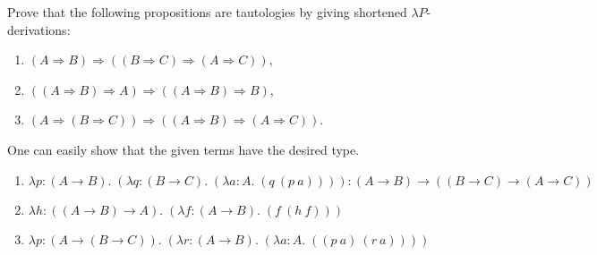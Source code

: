 \begin{problem}{5.7}
    Prove that the following propositions are tautologies by giving shortened $\lambda P$-derivations:
    \begin{enumerate}[label=$(\alph*)$]
    \item $(A \Rightarrow B) \Rightarrow ((B \Rightarrow C) \Rightarrow (A \Rightarrow C))$,
    \item $((A \Rightarrow B) \Rightarrow A) \Rightarrow ((A \Rightarrow B) \Rightarrow B)$,
    \item $(A \Rightarrow (B \Rightarrow C)) \Rightarrow ((A \Rightarrow B) \Rightarrow (A \Rightarrow C))$.
    \end{enumerate} 
\end{problem}

\begin{solution}
    One can easily show that the given terms have the desired type.
    \begin{enumerate}
        \item $ \lambda p : (A\to B).\;(\lambda q : (B\to C).\;(\lambda a : A.\; (q\ (p\ a)) )) : (A\to B) \to ((B\to C)\to (A\to C)) $
        \item $ \lambda h : ((A\to B)\to A).\;(\lambda f : (A\to B).\; (f\ (h\ f))) $
        \item $ \lambda p : (A\to (B\to C)).\;(\lambda r : (A\to B).\;(\lambda a : A.\; ((p\ a)\ (r\ a)) )) $
    \end{enumerate}
\end{solution}